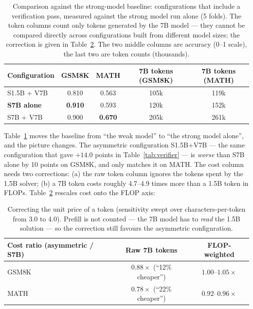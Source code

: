 \documentclass[11pt,a4paper]{article}
\begin{document}
\begin{table}[h]\centering\small
\begin{tabular}{@{}l c c c c@{}}
\toprule
Configuration & GSM8K & MATH & 7B tokens (GSM8K) & 7B tokens (MATH)\\
\midrule
S1.5B + V7B & 0.810 & 0.563 & 105k & 119k\\
\textbf{S7B alone} & \textbf{0.910} & 0.593 & 120k & 152k\\
S7B + V7B & 0.900 & \textbf{0.670} & 205k & 261k\\
\bottomrule
\end{tabular}
\caption{Comparison against the strong-model baseline: configurations that include a verification pass, measured against the strong model run alone (5 folds). The token columns count only tokens generated by the 7B model --- they cannot be compared directly across configurations built from different model sizes; the correction is given in Table~\ref{tab:flop}. The two middle columns are accuracy (0--1 scale), the last two are token counts (thousands).}
\label{tab:baseline}
\end{table}

Table~\ref{tab:baseline} moves the baseline from ``the weak model'' to ``the strong model alone'', and the picture changes. The asymmetric configuration S1.5B+V7B --- the same configuration that gave $+14.0$ points in Table~\ref{tab:verifier} --- is \emph{worse} than S7B alone by 10 points on GSM8K, and only matches it on MATH. The cost column needs two corrections: (a) the raw token column ignores the tokens spent by the 1.5B solver; (b) a 7B token costs roughly 4.7--4.9 times more than a 1.5B token in FLOPs. Table~\ref{tab:flop} rescales cost onto the FLOP axis:

\begin{table}[h]\centering\small
\begin{tabular}{@{}l c c@{}}
\toprule
Cost ratio (asymmetric / S7B) & Raw 7B tokens & FLOP-weighted\\
\midrule
GSM8K & $0.88\times$ (``12\% cheaper'') & $\mathbf{1.00\text{--}1.05\times}$ \\
MATH & $0.78\times$ (``22\% cheaper'') & $\mathbf{0.92\text{--}0.96\times}$ \\
\bottomrule
\end{tabular}
\caption{Correcting the unit price of a token (sensitivity swept over characters-per-token from 3.0 to 4.0). Prefill is not counted --- the 7B model has to \emph{read} the 1.5B solution --- so the correction still favours the asymmetric configuration.}
\label{tab:flop}
\end{table}
\end{document}
